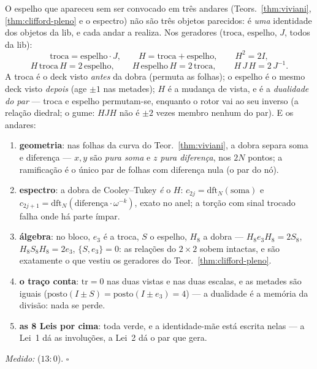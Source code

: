 \documentclass[livro.tex]{subfiles}
\begin{document}
\begin{teorema}\label{thm:universal-espelho}
O espelho que apareceu sem ser convocado em tr\^es andares
(Teors.~\ref{thm:viviani}, \ref{thm:clifford-pleno} e o espectro) n\~ao
s\~ao tr\^es objetos parecidos: \'e \emph{uma} identidade dos objetos da
lib, e cada andar a realiza. Nos geradores ($\mathrm{troca}$,
$\mathrm{espelho}$, $J$, todos da lib):
\[
\mathrm{troca}=\mathrm{espelho}\cdot J,\qquad
H=\mathrm{troca}+\mathrm{espelho},\qquad H^{2}=2I,
\]
\[
H\,\mathrm{troca}\,H=2\,\mathrm{espelho},\qquad
H\,\mathrm{espelho}\,H=2\,\mathrm{troca},\qquad
H\,J\,H=2\,J^{-1}.
\]
A troca \'e o deck visto \emph{antes} da dobra (permuta as folhas); o
espelho \'e o mesmo deck visto \emph{depois} (age $\pm1$ nas metades);
$H$ \'e a mudan\c{c}a de vista, e \'e a \emph{dualidade do par} --- troca
e espelho permutam-se, enquanto o rotor vai ao seu inverso (a
rela\c{c}\~ao diedral; o gume: $HJH$ n\~ao \'e $\pm2$ vezes membro
nenhum do par). E os andares:
\begin{enumerate}
\item \textbf{geometria}: nas folhas da curva do
Teor.~\ref{thm:viviani}, a dobra separa soma e diferen\c{c}a --- $x,y$
s\~ao \emph{pura soma} e $z$ \emph{pura diferen\c{c}a}, nos $2N$
pontos; a ramifica\c{c}\~ao \'e o \'unico par de folhas com
diferen\c{c}a nula (o par do n\'o).
\item \textbf{espectro}: a dobra de Cooley--Tukey \emph{\'e} o $H$:
$c_{2j}=\mathrm{dft}_{N}(\text{soma})$ e
$c_{2j+1}=\mathrm{dft}_{N}(\text{diferen\c{c}a}\cdot\omega^{-k})$,
exato no anel; a tor\c{c}\~ao com sinal trocado falha onde h\'a parte
\'impar.
\item \textbf{\'algebra}: no bloco, $e_{3}$ \'e a troca, $S$ o
espelho, $H_{8}$ a dobra --- $H_{8}e_{3}H_{8}=2S_{8}$,
$H_{8}S_{8}H_{8}=2e_{3}$, $\{S,e_{3}\}=0$: as rela\c{c}\~oes do
$2\times2$ sobem intactas, e s\~ao exatamente o que vestiu os
geradores do Teor.~\ref{thm:clifford-pleno}.
\item \textbf{o tra\c{c}o conta}: $\mathrm{tr}=0$ nas duas vistas e
nas duas escalas, e as metades s\~ao iguais
($\mathrm{posto}(I\pm S)=\mathrm{posto}(I\pm e_{3})=4$) --- a
dualidade \'e a mem\'oria da divis\~ao: nada se perde.
\item \textbf{as 8 Leis por cima}:  toda verde, e
a identidade-m\~ae est\'a escrita nelas --- a Lei~1 d\'a as
involu\c{c}\~oes, a Lei~2 d\'a o par que gera.
\end{enumerate}
\emph{Medido:}  ($13{:}0$).
$\square$
\end{teorema}
\end{document}
